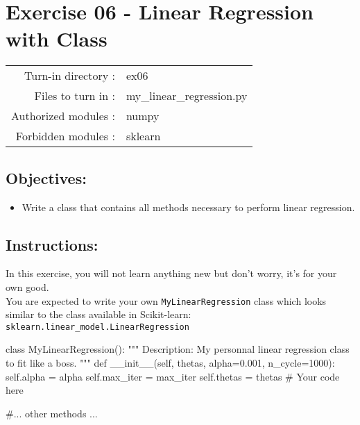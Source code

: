\documentclass[]{article}
\newenvironment{Shaded}{\begin{snugshade}}{\end{snugshade}}
\newcommand{\CommentTok}[1]{\textcolor[rgb]{0.48,0.49,0.49}{#1}}
\newcommand{\DecValTok}[1]{\textcolor[rgb]{0.96,0.45,0.00}{#1}}
\newcommand{\FloatTok}[1]{\textcolor[rgb]{0.96,0.45,0.00}{#1}}
\newcommand{\FunctionTok}[1]{\textcolor[rgb]{0.56,0.27,0.68}{#1}}
\newcommand{\KeywordTok}[1]{\textcolor[rgb]{0.81,0.81,0.76}{#1}}
\newcommand{\NormalTok}[1]{\textcolor[rgb]{0.81,0.81,0.76}{#1}}
\newcommand{\OperatorTok}[1]{\textcolor[rgb]{0.81,0.81,0.76}{#1}}
\newcommand{\VariableTok}[1]{\textcolor[rgb]{0.15,0.68,0.68}{#1}}
\providecommand{\tightlist}{%
  \setlength{\itemsep}{0pt}\setlength{\parskip}{0pt}}
\begin{document}
\clearpage

\hypertarget{exercise-06---linear-regression-with-class-1}{%
\section{Exercise 06 - Linear Regression with
Class}\label{exercise-06---linear-regression-with-class-1}}

\begin{longtable}[]{@{}rl@{}}
\toprule
\endhead
Turn-in directory : & ex06\tabularnewline
Files to turn in : & my\_linear\_regression.py\tabularnewline
Authorized modules : & numpy\tabularnewline
Forbidden modules : & sklearn\tabularnewline
\bottomrule
\end{longtable}

\hypertarget{objectives-5}{%
\subsection{Objectives:}\label{objectives-5}}

\begin{itemize}
\tightlist
\item
  Write a class that contains all methods necessary to perform linear
  regression.
\end{itemize}

\hypertarget{instructions-5}{%
\subsection{Instructions:}\label{instructions-5}}

In this exercise, you will not learn anything new but don't worry, it's
for your own good.\\
You are expected to write your own \texttt{MyLinearRegression} class
which looks similar to the class available in Scikit-learn:\\
\texttt{sklearn.linear\_model.LinearRegression}

\begin{Shaded}
\begin{Highlighting}[]
\KeywordTok{class}\NormalTok{ MyLinearRegression():}
    \CommentTok{"""}
\CommentTok{    Description:}
\CommentTok{        My personnal linear regression class to fit like a boss.}
\CommentTok{    """}
    \KeywordTok{def} \FunctionTok{__init__}\NormalTok{(}\VariableTok{self}\NormalTok{,  thetas, alpha}\OperatorTok{=}\FloatTok{0.001}\NormalTok{, n_cycle}\OperatorTok{=}\DecValTok{1000}\NormalTok{):}
              \VariableTok{self}\NormalTok{.alpha }\OperatorTok{=}\NormalTok{ alpha}
              \VariableTok{self}\NormalTok{.max_iter }\OperatorTok{=}\NormalTok{ max_iter}
              \VariableTok{self}\NormalTok{.thetas }\OperatorTok{=}\NormalTok{ thetas}
              \CommentTok{# Your code here}

    \CommentTok{#... other methods ...}
\end{Highlighting}
\end{Shaded}
\end{document}
